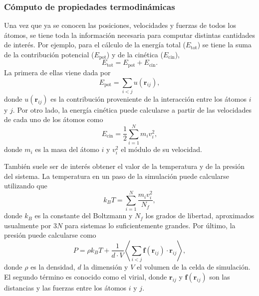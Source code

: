 

\subsubsection{Cómputo de propiedades termodinámicas}

Una vez que ya se conocen las posiciones, velocidades y fuerzas de todos los 
átomos, se tiene toda la información necesaria para computar distintas cantidades 
de interés. Por ejemplo, para el cálculo de la energía total ($E_{\text{tot}}$) 
se tiene la suma de la contribución potencial ($E_{\text{pot}}$) y de la cinética
($E_{\text{cin}}$),
\begin{equation}
    E_{\text{tot}} = E_{\text{pot}} + E_{\text{cin}}.
\end{equation}
La primera de ellas viene dada por 
\begin{equation}
    E_{\text{pot}} = \sum_{i < j} u(\mathbf{r}_{ij}),
\end{equation}
donde $u(\mathbf{r}_{ij})$ es la contribución proveniente de la interacción 
entre los átomos $i$ y $j$. Por otro lado, la energía cinética puede calcularse a
partir de las velocidades de cada uno de los átomos como
\begin{equation}
    E_{\text{cin}} = \frac{1}{2} \sum_{i=1}^{N} m_i v_i^2, 
\end{equation}
donde $m_i$ es la masa del átomo $i$ y $v_i^2$ el módulo de su velocidad. 

También suele ser de interés obtener el valor de la temperatura y de la presión
del sistema. La temperatura en un paso de la simulación puede calcularse 
utilizando que
\begin{equation}\label{eq:tempvel}
    k_B T = \sum_{i=1}^N \frac{m_i v_i^2}{N_f},
\end{equation}
donde $k_B$ es la constante del Boltzmann y $N_f$ los grados de libertad,
aproximados usualmente por $3N$ para sistemas lo suficientemente grandes. Por 
último, la presión puede calcularse como 
\begin{equation}
P = \rho k_B T + \frac{1}{d \cdot V} \left\langle \sum_{i<j} \mathbf{f}(\mathbf{r}_{ij}) \cdot \mathbf{r}_{ij} \right\rangle,
\end{equation}
donde $\rho$ es la densidad, $d$ la dimensión y $V$ el volumen de la celda de 
simulación. El segundo término es conocido como el virial, donde $\mathbf{r}_{ij}$ 
y $\mathbf{f}(\mathbf{r}_{ij})$ son las distancias y las fuerzas entre los átomos $i$ y $j$.


